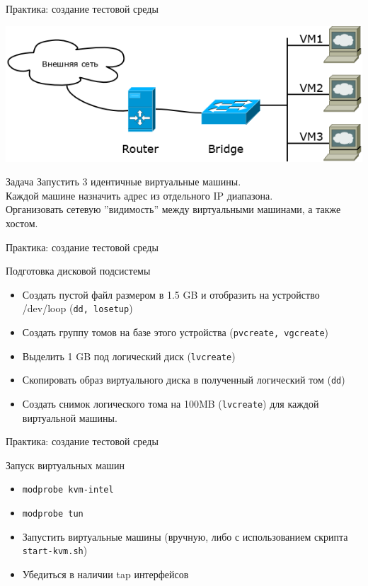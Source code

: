 \begin{frame}{Практика: создание тестовой среды}

	\center\includegraphics[height=0.4\textheight]{../../slides/networking/net-practice.png}


	\begin{block}{Задача}
		Запустить 3 идентичные виртуальные машины.\\
		Каждой машине назначить адрес из отдельного IP диапазона.\\
		Организовать сетевую ''видимость'' между виртуальными машинами, а также хостом.		
	\end{block}

\end{frame}



\begin{frame}{Практика: создание тестовой среды}
	\begin{block}{Подготовка дисковой подсистемы}
			\begin{itemize}
				\item Создать пустой файл размером в 1.5 GB и отобразить на устройство
					/dev/loop ({\tt dd, losetup})
				\item Создать группу томов на базе этого устройства ({\tt pvcreate, vgcreate})
				\item Выделить 1 GB под логический диск ({\tt lvcreate})
				\item Скопировать образ виртуального диска в полученный логический том ({\tt dd})
				\item Создать снимок логического тома на 100MB ({\tt lvcreate}) для каждой виртуальной машины.
			\end{itemize}
	\end{block}
\end{frame}

\begin{frame}{Практика: создание тестовой среды}

	\begin{block}{Запуск виртуальных машин}

		\begin{itemize}
			\item {\tt modprobe kvm-intel} 
			\item {\tt modprobe tun}
			\item Запустить виртуальные машины (вручную, либо с использованием скрипта {\tt start-kvm.sh})
			\item Убедиться в наличии tap интерфейсов
		\end{itemize}
	\end{block}

\end{frame}


